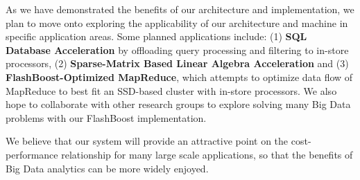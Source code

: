 \documentclass[pageno]{jpaper}
\begin{document}
As we have demonstrated the benefits of our architecture and implementation, we
plan to move onto exploring the applicability of our architecture and machine in
specific application areas. Some planned applications include: (1) \textbf{SQL
Database Acceleration} by offloading query processing and filtering to in-store
processors, (2) \textbf{Sparse-Matrix Based Linear Algebra Acceleration} and (3)
\textbf{FlashBoost-Optimized MapReduce}, which attempts to optimize data flow of
MapReduce to best fit an SSD-based cluster with in-store processors. We also
hope to collaborate with other research groups to explore solving many Big Data
problems with our FlashBoost implementation.

We believe that our system will provide an attractive point on the
cost-performance relationship for many large scale applications, so that the
benefits of Big Data analytics can be more widely enjoyed.

\vfill
\pagebreak



\end{document}
